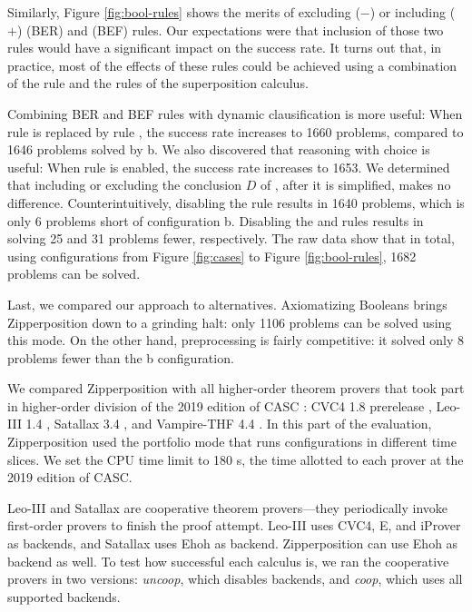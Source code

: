 Similarly, Figure \ref{fig:bool-rules} shows the merits of excluding ($-$) or including ($+$)
 (BER) and  (BEF) rules. Our
expectations were that inclusion of those two rules would have a significant impact on
the success rate. It turns out that, in practice, most of the effects of these
rules could be achieved using a combination of the  rule and the
rules of the superposition calculus.
\pagebreak[2]

Combining BER and BEF rules with dynamic clausification is more useful: When rule
 is replaced by rule , the success rate increases
to 1660 problems, compared to 1646 problems solved by b. We also discovered
that reasoning with choice is useful: When rule  is enabled, the
success rate increases to 1653. We determined that including or excluding the
conclusion $D$ of , after it is simplified, makes no difference.
Counterintuitively, disabling the  rule results in 1640 problems,
which is only 6 problems short of configuration b. Disabling the  and
 rules results in solving 25 and 31 problems fewer,
respectively. The raw data show that in total, using configurations from Figure
\ref{fig:cases} to Figure \ref{fig:bool-rules}, 1682 problems can be solved.

Last, we compared our approach to alternatives. Axiomatizing Booleans brings
Zipperposition down to a grinding halt: only 1106 problems can be solved using
this mode. On the other hand, preprocessing is fairly competitive: it solved
only 8 problems fewer than the b configuration.



We compared Zipperposition with all higher-order theorem provers that took part
in higher-order division of the 2019 edition of CASC \cite{gs-19-casc27}: CVC4 1.8 prerelease \cite{cbetal-11-cvc4},
Leo-III 1.4 \cite{sb-21-leo3}, Satallax 3.4
\cite{cb-12-satallax}, and Vampire-THF 4.4
\cite{lkav-13-vampire}. In this part of the evaluation, Zipperposition
used the portfolio mode that runs configurations in different time slices. 
We set the CPU time limit to 180 s, the time allotted to each prover at the 2019 edition of CASC.


Leo-III and Satallax are cooperative theorem provers---they periodically invoke
first-order provers to finish the proof attempt. Leo-III uses CVC4, E, and
iProver \cite{kk-08-iprover} as backends, and Satallax uses Ehoh
 as backend. Zipperposition can use Ehoh as backend as well. To test how successful each calculus is, we ran
the cooperative provers in two versions: \emph{uncoop}, which disables backends,
and \emph{coop}, which uses all supported backends.



